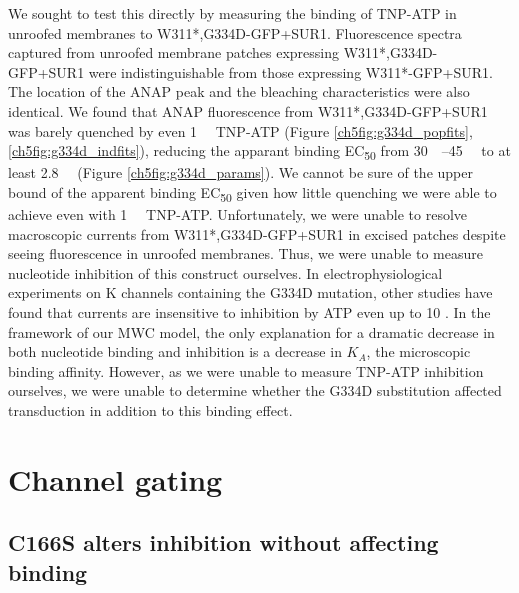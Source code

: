 We sought to test this directly by measuring the binding of TNP-ATP in unroofed membranes to W311*,G334D-GFP+SUR1.
Fluorescence spectra captured from unroofed membrane patches expressing W311*,G334D-GFP+SUR1 were indistinguishable from those expressing W311*-GFP+SUR1.
The location of the ANAP peak and the bleaching characteristics were also identical.
We found that ANAP fluorescence from W311*,G334D-GFP+SUR1 was barely quenched by even \SI{1}{\milli\Molar} TNP-ATP (Figure \ref{ch5fig:g334d_popfits}, \ref{ch5fig:g334d_indfits}), reducing the apparant binding EC\textsubscript{50} from \SIrange{30}{45}{\micro\Molar} to at least \SI{2.8}{\milli\Molar} (Figure \ref{ch5fig:g334d_params}).
We cannot be sure of the upper bound of the apparent binding EC\textsubscript{50} given how little quenching we were able to achieve even with \SI{1}{\milli\Molar} TNP-ATP.
Unfortunately, we were unable to resolve macroscopic currents from W311*,G334D-GFP+SUR1 in excised patches despite seeing fluorescence in unroofed membranes.
Thus, we were unable to measure nucleotide inhibition of this construct ourselves.
In electrophysiological experiments on K\ATP{} channels containing the G334D mutation, other studies have found that currents are insensitive to inhibition by ATP even up to \SI{10}{\Molar} \cite{drain_katp_1998, masia_atp-binding_2007-1}.
In the framework of our MWC model, the only explanation for a dramatic decrease in both nucleotide binding and inhibition is a decrease in $K_A$, the microscopic binding affinity.
However, as we were unable to measure TNP-ATP inhibition ourselves, we were unable to determine whether the G334D substitution affected transduction in addition to this binding effect.

\section{Channel gating}

\subsection{C166S alters inhibition without affecting binding}

